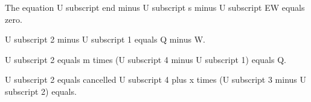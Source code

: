 The equation U subscript end minus U subscript s minus U subscript EW equals zero.

U subscript 2 minus U subscript 1 equals Q minus W.

U subscript 2 equals m times (U subscript 4 minus U subscript 1) equals Q.

U subscript 2 equals cancelled U subscript 4 plus x times (U subscript 3 minus U subscript 2) equals.